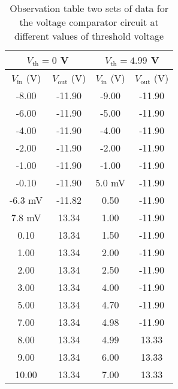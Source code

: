 \begin{table}[H]
    \centering
    \begin{tabular}{|c|c|c|c|} \hline
        \multicolumn{2}{|c|}{$V_\text{th} = 0$ V} & \multicolumn{2}{c|}{$V_\text{th} = 4.99$ V} \\ \hline
        $V_\text{in}$ (V) & $V_\text{out}$ (V) & $V_\text{in}$ (V) & $V_\text{out}$ (V) \\ \hline
        -8.00      & -11.90 & -9.00     & -11.90 \\
        -6.00      & -11.90 & -5.00    & -11.90 \\
        -4.00      & -11.90 & -4.00    & -11.90 \\
        -2.00      & -11.90 & -2.00     & -11.90 \\
        -1.00      & -11.90 & -1.00     & -11.90 \\
        -0.10      & -11.90 &  5.0 mV & -11.90 \\
        -6.3 mV   & -11.82 &  0.50   & -11.90 \\
         7.8 mV   &  13.34 &  1.00     & -11.90 \\
         0.10      &  13.34 &  1.50   & -11.90 \\
         1.00      &  13.34 &  2.00     & -11.90 \\
         2.00      &  13.34 &  2.50   & -11.90 \\
         3.00      &  13.34 &  4.00     & -11.90 \\
         5.00      &  13.34 &  4.70   & -11.90 \\
         7.00      &  13.34 &  4.98  & -11.90 \\
         8.00      &  13.34 &  4.99  &  13.33 \\
         9.00      &  13.34 &  6.00     &  13.33 \\
        10.00      &  13.34 &  7.00     &  13.33 \\ \hline
    \end{tabular}    
    \caption{Observation table two sets of data for the voltage comparator circuit at different values of threshold voltage}
    \label{tab:5}
\end{table}